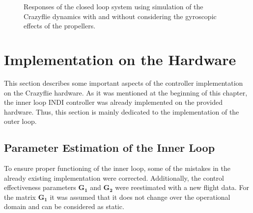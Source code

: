 \documentclass[11pt, a4paper, twoside]{report}
\begin{document}
\begin{figure}[H]
	\centering 
	\captionsetup{justification=centering, singlelinecheck=off, font=bf, belowskip=-0.5cm}
	\caption[Responses of the closed loop system with and without gyroscopic effects.]{Responses of the closed loop system using simulation of the Crazyflie dynamics with and without considering the gyroscopic effects of the propellers.}
	\label{fig:g2_comp}
\end{figure}

\section{Implementation on the Hardware} \label{sec:implementation_on_hardware}

This section describes some important aspects of the controller implementation on the Crazyflie hardware. As it was mentioned at the beginning of this chapter, the inner loop \acrshort{INDI} controller was already implemented on the provided hardware. Thus, this section is mainly dedicated to the implementation of the outer loop.

\subsection{Parameter Estimation of the Inner Loop} \label{subsec:parameter_estimation_inner}

To ensure proper functioning of the inner loop, some of the mistakes in the already existing implementation were corrected. Additionally, the control effectiveness parameters $\bm{G_1}$ and $\bm{G_2}$ were reestimated with a new flight data. For the matrix $\bm{G_1}$ it was assumed that it does not change over the operational domain and can be considered as static. 
\end{document}
